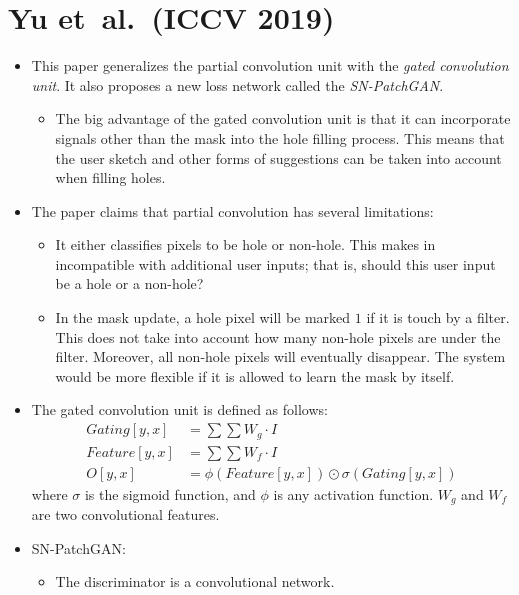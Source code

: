 \documentclass[10pt]{article}
\newcommand{\etal}{{et~al.}}
\begin{document}
  \section{Yu \etal~(ICCV 2019)}

  \begin{itemize}
  	\item This paper generalizes the partial convolution unit with the \emph{gated convolution unit}. It also proposes a new loss network called the \emph{SN-PatchGAN}.
    \begin{itemize}
      \item The big advantage of the gated convolution unit is that it can incorporate signals other than the mask into the hole filling process. This means that the user sketch and other forms of suggestions can be taken into account when filling holes.      
    \end{itemize}    

    \item The paper claims that partial convolution has several limitations:
    \begin{itemize}
      \item It either classifies pixels to be hole or non-hole. This makes in incompatible with additional user inputs; that is, should this user input be a hole or a non-hole?

      \item In the mask update, a hole pixel will be marked $1$ if it is touch by a filter. This does not take into account how many non-hole pixels are under the filter. Moreover, all non-hole pixels will eventually disappear. The system would be more flexible if it is allowed to learn the mask by itself.
    \end{itemize}

    \item The gated convolution unit is defined as follows:
    \begin{align*}
      Gating[y,x] &= \sum \sum W_g \cdot I \\
      Feature[y,x] &= \sum \sum W_f \cdot I \\
      O[y,x] &= \phi(Feature[y,x]) \odot \sigma(Gating[y,x])
    \end{align*}
    where $\sigma$ is the sigmoid function, and $\phi$ is any activation function. $W_g$ and $W_f$ are two convolutional features.

    \item SN-PatchGAN:
    \begin{itemize}
      \item The discriminator is a convolutional network.      
    

\end{itemize}
\end{itemize}
\end{document}
